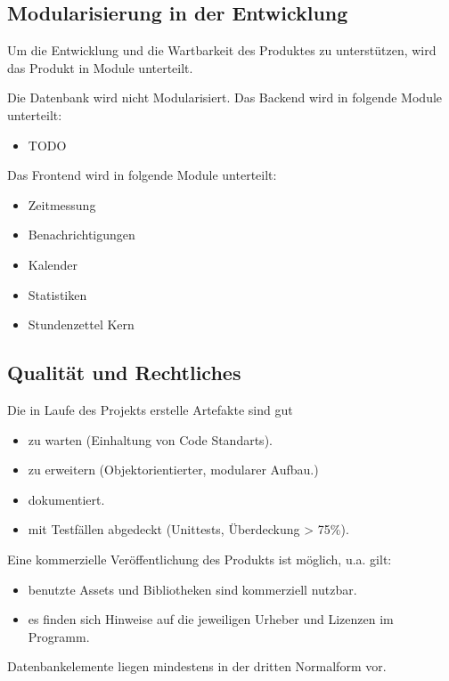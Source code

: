 \subsection{Modularisierung in der Entwicklung}

\begin{requirements}
     Um die Entwicklung und die Wartbarkeit des Produktes zu unterstützen, wird das Produkt in Module unterteilt.
    \begin{requirements}
         Die Datenbank wird nicht Modularisiert.
         Das Backend wird in folgende Module unterteilt:
            \begin{itemize}
                \item TODO
            \end{itemize}
         Das Frontend wird in folgende Module unterteilt:
            \begin{itemize}
                \item Zeitmessung
                \item Benachrichtigungen
                \item Kalender
                \item Statistiken
                \item Stundenzettel Kern
            \end{itemize}
    \end{requirements}
\end{requirements}

\subsection{Qualität und Rechtliches}
\begin{requirements}
     Die in Laufe des Projekts erstelle Artefakte sind gut
    \begin{itemize}
        \item zu warten (Einhaltung von Code Standarts).
        \item zu erweitern (Objektorientierter, modularer Aufbau.)
        \item dokumentiert.
        \item mit Testfällen abgedeckt (Unittests, Überdeckung > 75\%).
    \end{itemize}
     Eine kommerzielle Veröffentlichung des Produkts ist möglich, u.a. gilt:
    \begin{itemize}
        \item benutzte Assets und Bibliotheken sind kommerziell nutzbar.
    	\item es finden sich Hinweise auf die jeweiligen Urheber und Lizenzen im Programm.
    \end{itemize}
     Datenbankelemente liegen mindestens in der dritten Normalform vor.
\end{requirements}
